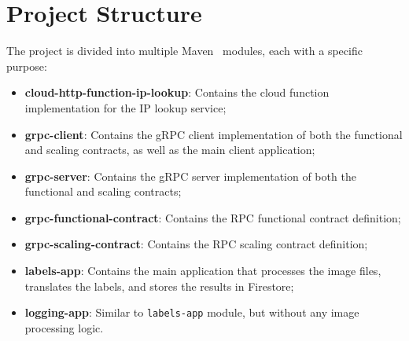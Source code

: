 \chapter{Project Structure}\label{ch:project_structure}

The project is divided into multiple Maven~\cite{maven} modules, each with a specific purpose:

\begin{itemize}
    \item \textbf{cloud-http-function-ip-lookup}: Contains the cloud function implementation for the IP lookup service;
    \item \textbf{grpc-client}:
    Contains the gRPC client implementation of both the functional and scaling contracts, as well as the main client application;
    \item \textbf{grpc-server}: Contains the gRPC server implementation of both the functional and scaling contracts;
    \item \textbf{grpc-functional-contract}: Contains the RPC functional contract definition;
    \item \textbf{grpc-scaling-contract}: Contains the RPC scaling contract definition;
    \item \textbf{labels-app}: Contains the main application that processes the image files, translates the labels, and stores the results in Firestore;
    \item \textbf{logging-app}: Similar to \texttt{labels-app} module, but without any image processing logic.
\end{itemize}
